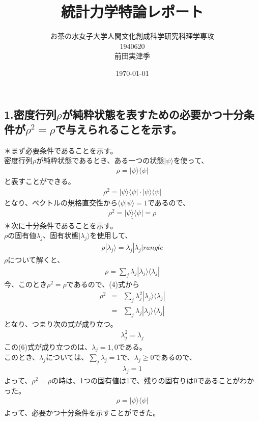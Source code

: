 \documentclass[10pt]{jreport}
\begin{document}
\title{統計力学特論レポート}

\author{お茶の水女子大学人間文化創成科学研究科理学専攻 \\1940620 \\ 前田実津季}
\date{\today}
\maketitle

\subsection*{1.密度行列$\rho$が純粋状態を表すための必要かつ十分条件が$\rho ^2 =\rho$で与えられることを示す。}
＊まず必要条件であることを示す。\\
密度行列$\rho$が純粋状態であるとき、ある一つの状態$| \psi \rangle$を使って、
\begin{eqnarray}
\rho = |\psi \rangle \langle \psi |
\end{eqnarray}
と表すことができる。
\begin{eqnarray}
\rho^2 = |\psi \rangle \langle \psi | \cdot |\psi \rangle \langle \psi | 
\end{eqnarray}
となり、ベクトルの規格直交性から$ \langle \psi  |\psi \rangle =1$であるので、
\begin{eqnarray}
\underline{\rho^2 = |\psi \rangle \langle \psi | =\rho}
\end{eqnarray}
＊次に十分条件であることを示す。\\
$\rho$の固有値$\lambda_j$、固有状態$|\lambda_j \rangle $を使用して、
\begin{eqnarray}
\rho |\lambda_j \rangle = \lambda_j |\lambda_j |rangle \nonumber
\end{eqnarray}
$\rho$について解くと、
\begin{eqnarray}
\rho = \sum_j \lambda_j |\lambda_j \rangle \langle \lambda_j | 
\end{eqnarray}
今、このとき$\rho^2 =\rho$であるので、(4)式から
\begin{eqnarray}
\rho^2 &=& \sum_j \lambda_j^2|\lambda_j \rangle \langle \lambda_j | \nonumber \\
&=& \sum_j \lambda_j |\lambda_j \rangle \langle \lambda_j | 
\end{eqnarray}
となり、つまり次の式が成り立つ。
\begin{eqnarray}
\lambda_j^2 = \lambda_j
\end{eqnarray}
この(6)式が成り立つのは、$\lambda_j=1,0$である。\\
このとき、$\lambda_j$については、$\sum_j \lambda_j =1 $で、$\lambda_j \geq 0$であるので、
\begin{eqnarray}
\lambda_j =1 \nonumber
\end{eqnarray}
よって、$\rho^2 =\rho$の時は、1つの固有値は1で、残りの固有りは0であることがわかった。
\begin{eqnarray}
\underline{\rho =  |\psi \rangle \langle \psi |}
\end{eqnarray}
よって、必要かつ十分条件を示すことができた。
\end{document}
